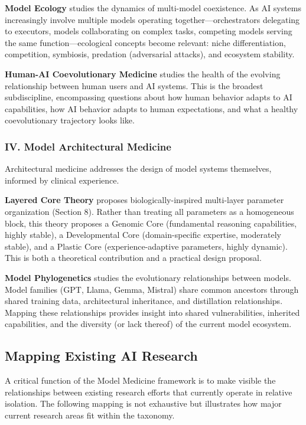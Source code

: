 \documentclass[11pt]{article}
\begin{document}
\textbf{Model Ecology} studies the dynamics of multi-model coexistence. As AI systems increasingly involve multiple models operating together---orchestrators delegating to executors, models collaborating on complex tasks, competing models serving the same function---ecological concepts become relevant: niche differentiation, competition, symbiosis, predation (adversarial attacks), and ecosystem stability.

\textbf{Human-AI Coevolutionary Medicine} studies the health of the evolving relationship between human users and AI systems. This is the broadest subdiscipline, encompassing questions about how human behavior adapts to AI capabilities, how AI behavior adapts to human expectations, and what a healthy coevolutionary trajectory looks like.

\subsubsection{IV. Model Architectural Medicine}

Architectural medicine addresses the design of model systems themselves, informed by clinical experience.

\textbf{Layered Core Theory} proposes biologically-inspired multi-layer parameter organization (Section 8). Rather than treating all parameters as a homogeneous block, this theory proposes a Genomic Core (fundamental reasoning capabilities, highly stable), a Developmental Core (domain-specific expertise, moderately stable), and a Plastic Core (experience-adaptive parameters, highly dynamic). This is both a theoretical contribution and a practical design proposal.

\textbf{Model Phylogenetics} studies the evolutionary relationships between models. Model families (GPT, Llama, Gemma, Mistral) share common ancestors through shared training data, architectural inheritance, and distillation relationships. Mapping these relationships provides insight into shared vulnerabilities, inherited capabilities, and the diversity (or lack thereof) of the current model ecosystem.

\subsection{Mapping Existing AI Research}

A critical function of the Model Medicine framework is to make visible the relationships between existing research efforts that currently operate in relative isolation. The following mapping is not exhaustive but illustrates how major current research areas fit within the taxonomy.
\end{document}
